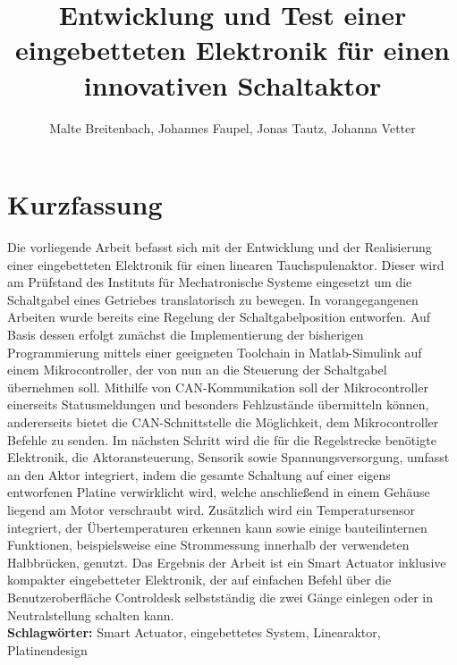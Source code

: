 \documentclass[nochapterpage,bigchapter,linedtoc,longdoc,colorback,accentcolor=tud1c]{tudreport}
\title{Entwicklung und Test einer eingebetteten Elektronik für einen innovativen Schaltaktor}
\subtitle{Malte Breitenbach, Johannes Faupel, Jonas Tautz, Johanna Vetter}
\begin{document}
\maketitle
{}
\section*{Kurzfassung}
Die vorliegende Arbeit befasst sich mit der Entwicklung und der Realisierung  einer eingebetteten Elektronik für einen linearen Tauchspulenaktor.  Dieser wird am Prüfstand des Instituts für Mechatronische Systeme eingesetzt um die Schaltgabel eines Getriebes translatorisch zu bewegen.
In vorangegangenen Arbeiten wurde bereits eine Regelung der Schaltgabelposition entworfen. Auf Basis dessen erfolgt zunächst die Implementierung der bisherigen Programmierung mittels einer geeigneten Toolchain in Matlab-Simulink auf einem Mikrocontroller, der von nun an die Steuerung der Schaltgabel übernehmen soll. Mithilfe von CAN-Kommunikation soll der Mikrocontroller einerseits Statusmeldungen und besonders Fehlzustände übermitteln können, andererseits bietet die CAN-Schnittstelle die Möglichkeit, dem Mikrocontroller Befehle zu senden. Im nächsten Schritt wird die für die Regelstrecke benötigte Elektronik, die Aktoransteuerung, Sensorik sowie Spannungsversorgung, umfasst an den Aktor integriert, indem die gesamte Schaltung auf einer eigens entworfenen Platine verwirklicht wird, welche anschließend in einem Gehäuse liegend am Motor verschraubt wird. Zusätzlich wird ein Temperatursensor integriert, der Übertemperaturen erkennen kann sowie einige bauteilinternen Funktionen, beispielsweise eine Strommessung innerhalb der verwendeten Halbbrücken, genutzt.  Das Ergebnis der Arbeit ist ein Smart Actuator inklusive kompakter eingebetteter Elektronik, der auf einfachen Befehl über die Benutzeroberfläche Controldesk selbstständig die zwei Gänge einlegen oder in Neutralstellung schalten kann.\\

\textbf{Schlagwörter:} Smart Actuator, eingebettetes System, Linearaktor, Platinendesign
\end{document}

